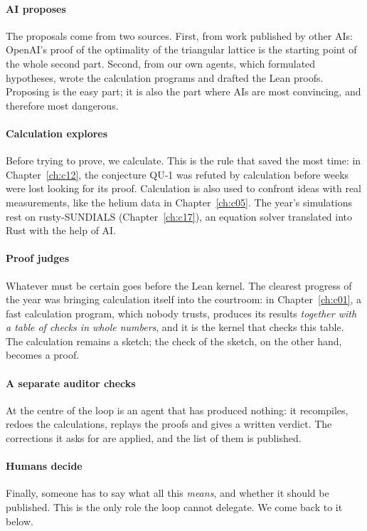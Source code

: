 \paragraph{AI proposes} The proposals come from two sources. First, from work published by other AIs: OpenAI's proof
of the optimality of the triangular lattice is the starting point of the whole second part. Second, from our own
agents, which formulated hypotheses, wrote the calculation programs and drafted the Lean proofs. Proposing is the easy
part; it is also the part where AIs are most convincing, and therefore most dangerous.

\paragraph{Calculation explores} Before trying to prove, we calculate. This is the rule that saved the most time: in
Chapter~\ref{ch:c12}, the conjecture QU-1 was refuted by calculation before weeks were lost looking for its proof.
Calculation is also used to confront ideas with real measurements, like the helium data in Chapter~\ref{ch:c05}. The
year's simulations rest on rusty-SUNDIALS (Chapter~\ref{ch:c17}), an equation solver translated into Rust with the
help of AI.

\paragraph{Proof judges} Whatever must be certain goes before the Lean kernel. The clearest progress of the year was
bringing calculation itself into the courtroom: in Chapter~\ref{ch:c01}, a fast calculation program, which nobody
trusts, produces its results \emph{together with a table of checks in whole numbers}, and it is the kernel that checks
this table. The calculation remains a sketch; the check of the sketch, on the other hand, becomes a proof.

\paragraph{A separate auditor checks} At the centre of the loop is an agent that has produced nothing: it recompiles,
redoes the calculations, replays the proofs and gives a written verdict. The corrections it asks for are applied, and
the list of them is published.

\paragraph{Humans decide} Finally, someone has to say what all this \emph{means}, and whether it should be published.
This is the only role the loop cannot delegate. We come back to it below.

